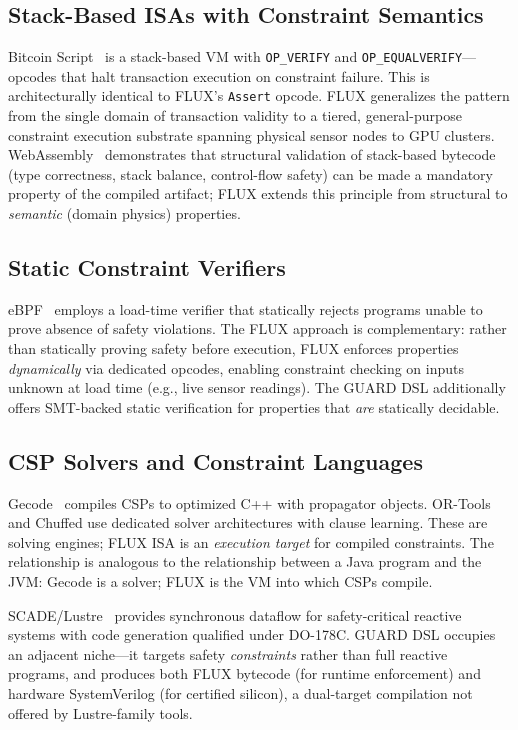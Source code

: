 \documentclass[sigplan,10pt,review]{acmart}
\begin{document}
\subsection{Stack-Based ISAs with Constraint Semantics}

Bitcoin Script~\cite{nakamoto2008} is a stack-based VM with \texttt{OP\_VERIFY} and
\texttt{OP\_EQUALVERIFY}---opcodes that halt transaction execution on constraint
failure. This is architecturally identical to FLUX's \texttt{Assert} opcode. FLUX
generalizes the pattern from the single domain of transaction validity to a tiered,
general-purpose constraint execution substrate spanning physical sensor nodes to GPU
clusters. WebAssembly~\cite{haas2017} demonstrates that structural validation of
stack-based bytecode (type correctness, stack balance, control-flow safety) can be
made a mandatory property of the compiled artifact; FLUX extends this principle from
structural to \emph{semantic} (domain physics) properties.

\subsection{Static Constraint Verifiers}

eBPF~\cite{gregg2019} employs a load-time verifier that statically rejects programs
unable to prove absence of safety violations. The FLUX approach is complementary:
rather than statically proving safety before execution, FLUX enforces properties
\emph{dynamically} via dedicated opcodes, enabling constraint checking on inputs
unknown at load time (e.g., live sensor readings). The GUARD DSL additionally offers
SMT-backed static verification for properties that \emph{are} statically decidable.

\subsection{CSP Solvers and Constraint Languages}

Gecode~\cite{schulte2009} compiles CSPs to optimized C++ with propagator objects.
OR-Tools~\cite{perron2019} and Chuffed use dedicated solver architectures with
clause learning. These are solving engines; FLUX ISA is an \emph{execution target}
for compiled constraints. The relationship is analogous to the relationship between
a Java program and the JVM: Gecode is a solver; FLUX is the VM into which CSPs compile.

SCADE/Lustre~\cite{halbwachs1991} provides synchronous dataflow for safety-critical
reactive systems with code generation qualified under DO-178C. GUARD DSL occupies an
adjacent niche---it targets safety \emph{constraints} rather than full reactive programs,
and produces both FLUX bytecode (for runtime enforcement) and hardware SystemVerilog (for
certified silicon), a dual-target compilation not offered by Lustre-family tools.
\end{document}
